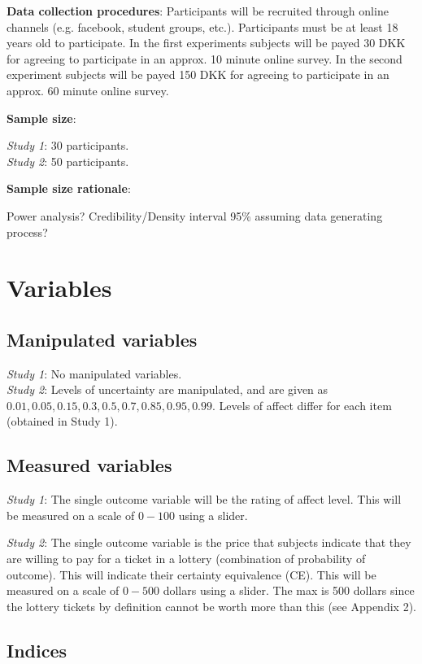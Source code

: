 \documentclass[12pt]{article}
\begin{document}
\textbf{Data collection procedures}:
Participants will be recruited through online
channels (e.g. facebook, student groups, etc.).
Participants must be at least 18 years old to
participate. In the first experiments subjects
will be payed 30 DKK for agreeing to participate
in an approx. 10 minute online survey. In the
second experiment subjects will be payed 150 DKK
for agreeing to participate in an approx. 60 minute
online survey.

\textbf{Sample size}:

\emph{Study 1}: 30 participants. \\
\emph{Study 2}: 50 participants.

\textbf{Sample size rationale}:

Power analysis?
Credibility/Density interval 95\%
assuming data generating process?

\section{Variables}

\subsection{Manipulated variables}
\emph{Study 1}: No manipulated variables. \\

\emph{Study 2}: Levels of uncertainty are
manipulated, and are given as
$0.01, 0.05, 0.15, 0.3, 0.5, 0.7, 0.85, 0.95, 0.99$.
Levels of affect differ for each item
(obtained in Study 1).

\subsection{Measured variables}
\emph{Study 1}: The single outcome variable
will be the rating of affect level. This will
be measured on a scale of $0-100$ using a
slider.

\emph{Study 2}: The single outcome variable
is the price that subjects indicate that they
are willing to pay for a ticket in a lottery
(combination of probability of outcome).
This will indicate their certainty equivalence (CE).
This will be measured on a scale of $0-500$ dollars
using a slider. The max is 500 dollars since the
lottery tickets by definition cannot be worth
more than this (see Appendix 2).

\subsection{Indices}
\end{document}
